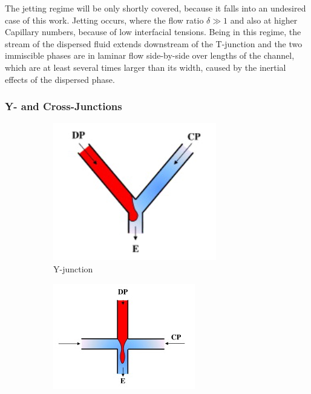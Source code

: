 The jetting regime will be only shortly covered, because it falls into an undesired case of this work. Jetting occurs, where the flow ratio $\delta \gg 1$ and also at higher Capillary numbers, because of low interfacial tensions. Being in this regime, the stream of the dispersed fluid extends downstream
of the T-junction and the two immiscible phases are in laminar flow side-by-side over
lengths of the channel, which are at least several times larger than its width, caused by the inertial effects of the dispersed phase.\cite{lit:fluidics:droplet:formation:jetting}


\subsubsection{Y- and Cross-Junctions}
\begin{figure}
	\vspace{-5mm}
	\begin{subfigure}{0.49\linewidth}
		\centering
		\includegraphics[clip,trim={0mm 0mm 5mm 15mm}, width=.9\linewidth]{Ressourcen/IMG/y-junction}
		\caption{Y-junction}
		\label{fig:fluidics:droplet:y-junction}
	\end{subfigure}
	\hfil
	\begin{subfigure}{0.49\linewidth}
		\centering
		\includegraphics[clip,trim={0mm -3mm 00mm 15mm},width=1.1\linewidth]{Ressourcen/IMG/cross-junction}

\end{subfigure}
\end{figure}
